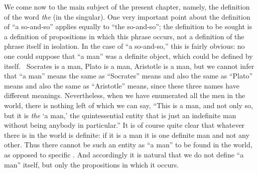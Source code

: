 {We come now to the main subject of the
pre\-sent chapter,
namely, the
definition of the word \textit{the}
(in the singular). One very important point
about the definition of ``a so-and-so'' applies equal\-ly to ``the
so-and-so''; the definition to be sought is a definition of propositions
in which this phrase occurs, not a definition of the phrase itself in
isolation. In the case of ``a so-and-so,'' this is fairly obvious: no one
could suppose that ``a man'' was a definite object, which could be
defined by itself.\  
Socrates is a man, Plato is a man,
Aristotle is a man, but
we
cannot
infer that ``a man'' means the same as ``Socrates'' means and also the same
as ``Plato'' means and also the same as ``Aristotle'' means, since these
three names have different meanings. Nevertheless, when we have
enumerated all the men in the world, there is nothing left of which we
can say, ``This is a man, and not only so, but it is \textit{the }`a man,' the
quintessential entity that is just an indefinite man without being anybody 
in particular.'' It is of course quite clear that whatever there is
in the world is definite: if it is a man it is one definite man and not
any other. Thus there cannot be such an entity as ``a man'' to be found
in the world, as opposed to specific \label{change:manmen}. And accordingly it is natural
that we do not define ``a man'' itself, but only the propositions in
which it occurs.}
\aftonly{\enlargethispage{\baselineskip}}
